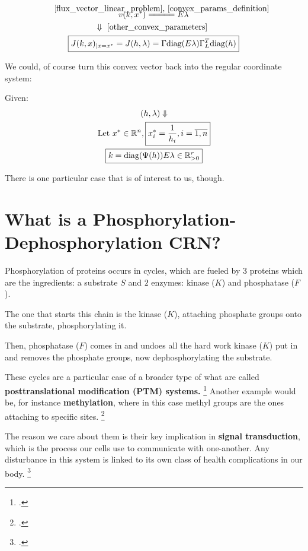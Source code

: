 \begin{gather}\label{jacobian_convex_params}
	v(k, x^*) \eqCuzConvex E \lambda  \notag \\
	\Downarrow \text{ \ref{other_convex_parameters} } \notag \\
	\boxed{J(k,x)_{|x=x^{*}}=J(h,\lambda)=\Gamma \text{diag}(E\lambda)\Gamma_{L}^{T}\text{diag}(h)}
\end{gather}

We could, of course turn this convex vector back into the regular coordinate system:

Given:
\begin{gather}\label{k_convert_back_from_convex}
	(h,\lambda) \Downarrow \notag \\
	\text{Let  } x^* \in \mathbb{R}^n , \boxed{
		x^*_i = \frac{1}{h_i} , i = \overline{1,n}
	} \notag \\
	\boxed{
		k = \text{diag}(\Psi(h)) E \lambda \in \mathbb{R}^r_{> 0}
 }
\end{gather}

There is one particular case that is of interest to us, though.

\section{What is a Phosphorylation-Dephosphorylation CRN?}\label{ch:phoshpho-dephospho-crn}

Phosphorylation of proteins occurs in cycles, which are fueled by $3$ proteins which are the ingredients: a substrate $S$ and $2$ enzymes: kinase ($K$) and phosphatase ($F$).

The one that starts this chain is the kinase ($K$), attaching phosphate groups onto the substrate, phosphorylating it.

Then, phosphatase ($F$) comes in and undoes all the hard work kinase ($K$) put in and removes the phosphate groups, now dephosphorylating the substrate.

\hfill\break
These cycles are a particular case of a broader type of what are called \textbf{posttranslational modification (PTM) systems.} \footcite{conradi2024} Another example would be, for instance \textbf{methylation}, where in this case methyl groups are the ones attaching to specific sites. \footcite{ramazi2021Ptms, SCHOENHEIMER1939333}

The reason we care about them is their key implication in \textbf{ signal transduction}, which is the process our cells use to communicate with one-another. Any disturbance in this system is linked to its own class of health complications in our body. \footcite{CONRADI2018507, 10.1093/hmg/ddp186, cohen2001Phosphorylation}

